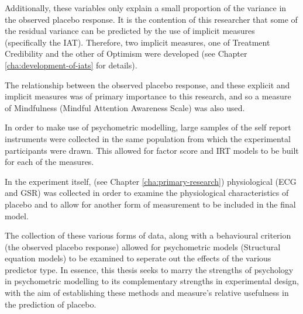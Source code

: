 Additionally, these variables only explain a small proportion of the variance in the observed placebo response. It is the contention of this researcher that some of the residual variance can be predicted by the use of implicit measures (specifically the IAT). Therefore, two implicit measures, one of Treatment Credibility and the other of Optimism were developed (see Chapter \ref{cha:development-of-iats} for details). 

The relationship between the observed placebo response, and these explicit and implicit measures was of primary importance to this research, and so a measure of Mindfulness (Mindful Attention Awareness Scale) was also used. 

In order to make use of psychometric modelling, large samples of the self report instruments were collected in the same population from which the experimental participants were drawn. This allowed for factor score and IRT models to be built for each of the measures. 

In the experiment itself, (see Chapter \ref{cha:primary-research}) physiological (ECG and GSR) was collected in order to examine the physiological characteristics of placebo and to allow for another form of measurement to be included in the final model.

The collection of these various forms of data, along with a behavioural criterion (the observed placebo response) allowed for psychometric models (Structural equation models) to be examined to seperate out the effects of the various predictor type. In essence, this thesis seeks to marry the strengths of psychology in psychometric modelling to its complementary strengths in experimental design, with the aim of establishing these methods and measure's relative usefulness in the prediction of placebo. 

